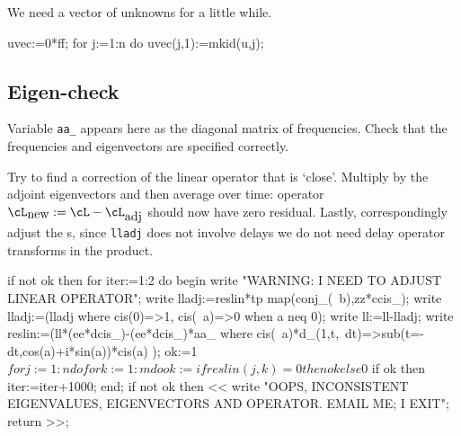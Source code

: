 \documentclass[11pt,a5paper]{article}
\begin{document}
We need a vector of unknowns for a little while.
\begin{reduce}
uvec:=0*ff; %
for j:=1:n do uvec(j,1):=mkid(u,j);
\end{reduce}


\subsection{Eigen-check}

Variable \verb|aa_| appears here as the diagonal matrix of frequencies.
Check that the frequencies and eigenvectors are specified correctly.


Try to find a correction of the linear operator that is `close'.
Multiply by the adjoint eigenvectors and then average over time: operator \(\cL_{\text{new}}:=\cL-\cL_{\text{adj}}\) should now have zero residual.
Lastly, correspondingly adjust the \ode{}s, since \verb|lladj| does not involve delays we do not need delay operator transforms in the product.

\begin{reduce}
if not ok then for iter:=1:2 do begin
write "WARNING: I NEED TO ADJUST LINEAR OPERATOR";
write
lladj:=reslin*tp map(conj_(~b),zz*ccis_);
write
lladj:=(lladj where {cis(0)=>1, cis(~a)=>0 when a neq 0});
write
ll:=ll-lladj;
write
reslin:=(ll*(ee*dcis_)-(ee*dcis_)*aa_
    where cis(~a)*d_(1,t,~dt)=>sub(t=-dt,cos(a)+i*sin(a))*cis(a) ); 
ok:=1$
for j:=1:n do for k:=1:m do 
    ok:=if reslin(j,k)=0 then ok else 0$
if ok then iter:=iter+1000;
end;
if not ok then << write
    "OOPS, INCONSISTENT EIGENVALUES, EIGENVECTORS AND OPERATOR.
    EMAIL ME; I EXIT"; 
    return >>;
\end{reduce}
\end{document}

